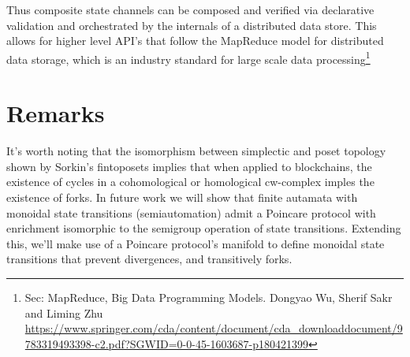 \documentclass{article}
\begin{document}
Thus composite state channels can be composed and verified via declarative validation and orchestrated by the internals of a distributed data store. This allows for higher level API's that follow the MapReduce model for distributed data storage, which is an industry standard for large scale data processing\footnote{Sec: MapReduce, Big Data Programming Models. Dongyao Wu, Sherif Sakr and Liming Zhu \url{https://www.springer.com/cda/content/document/cda_downloaddocument/9783319493398-c2.pdf?SGWID=0-0-45-1603687-p180421399}} 


\section{Remarks} 
It's worth noting that the isomorphism between simplectic and poset topology shown by Sorkin's fintoposets implies that when applied to blockchains, the existence of cycles in a cohomological or homological cw-complex imples the existence of forks. In future work we will show that finite autamata with monoidal state transitions (semiautomation) admit a Poincare protocol with enrichment isomorphic to the semigroup operation of state transitions. Extending this, we'll make use of a Poincare protocol's manifold to define monoidal state transitions that prevent divergences, and transitively forks.


\end{document}
